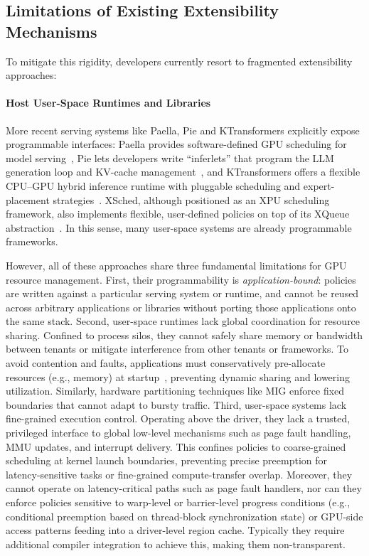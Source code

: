 \subsection{Limitations of Existing Extensibility Mechanisms}


To mitigate this rigidity, developers currently resort to fragmented extensibility approaches:

\paragraph{Host User-Space Runtimes and Libraries}
More recent serving systems like Paella, Pie and KTransformers explicitly expose programmable interfaces: Paella provides software-defined GPU scheduling for model serving~\cite{paella}, Pie lets developers write ``inferlets'' that program the LLM generation loop and KV-cache management~\cite{pie}, and KTransformers offers a flexible CPU--GPU hybrid inference runtime with pluggable scheduling and expert-placement strategies~\cite{ktransformers}. XSched, although positioned as an XPU scheduling framework, also implements flexible, user-defined policies on top of its XQueue abstraction~\cite{xsched}. In this sense, many user-space systems are already programmable frameworks.

However, all of these approaches share three fundamental limitations for GPU resource management. First, their programmability is \emph{application-bound}: policies are written against a particular serving system or runtime, and cannot be reused across arbitrary applications or libraries without porting those applications onto the same stack. Second, user-space runtimes lack global coordination for resource sharing. Confined to process silos, they cannot safely share memory or bandwidth between tenants or mitigate interference from other tenants or frameworks. To avoid contention and faults, applications must conservatively pre-allocate resources (e.g., memory) at startup~\cite{lmcache}, preventing dynamic sharing and lowering utilization. Similarly, hardware partitioning techniques like MIG enforce fixed boundaries that cannot adapt to bursty traffic. Third, user-space systems lack fine-grained execution control. Operating above the driver, they lack a trusted, privileged interface to global low-level mechanisms such as page fault handling, MMU updates, and interrupt delivery. This confines policies to coarse-grained scheduling at kernel launch boundaries, preventing precise preemption for latency-sensitive tasks or fine-grained compute-transfer overlap. Moreover, they cannot operate on latency-critical paths such as page fault handlers, nor can they enforce policies sensitive to warp-level or barrier-level progress conditions (e.g., conditional preemption based on thread-block synchronization state) or GPU-side access patterns feeding into a driver-level region cache. Typically they require additional compiler integration to achieve this, making them non-transparent.

